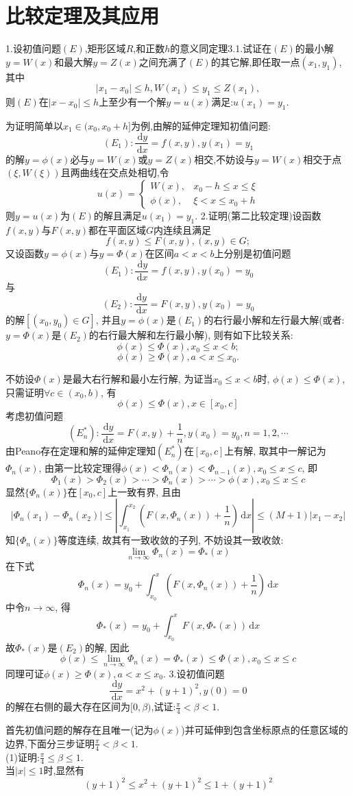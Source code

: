 \documentclass[titlepage,11pt,a4paper,twoside]{report}
\makeatletter
\newcommand\diff{\,\mathrm{d}}
\renewenvironment{proof}{\par
	\pushQED{\qed}%
	\normalfont \topsep1\p@\@plus6\p@\relax
	\trivlist
	\item\relax
	{\hspace*{\parindent}{\heiti 证明}\@addpunct{:}}\hspace\labelsep\ignorespaces
}{%
	\popQED\endtrivlist\@endpefalse
}
\makeatother
\begin{document}
\section{比较定理及其应用}
1.设初值问题$(E)$,矩形区域$R$,和正数$h$的意义同定理3.1.试证在$(E)$的最小解$y=W(x)$和最大解$y=Z(x)$之间充满了$(E)$的其它解,即任取一点$(x_1,y_1)$,其中
\[|x_1-x_0|\leq h,W(x_1)\leq y_1\leq Z(x_1),\]
则$(E)$在$|x-x_0|\leq h$上至少有一个解$y=u(x)$满足:$u(x_1)=y_1$.
\begin{proof}
为证明简单以$x_1\in(x_0,x_0+h]$为例,由解的延伸定理知初值问题:\[(E_1):\frac{\diff y}{\diff x}=f(x,y),y(x_1)=y_1\]的解$y=\phi(x)$必与$y=W(x)$或$y=Z(x)$相交,不妨设与$y=W(x)$相交于点$(\xi,W(\xi))$且两曲线在交点处相切,令
\[u(x)=\begin{cases}
W(x),&x_0-h\leq x\leq\xi\\
\phi(x),&\xi<x\leq x_0+h
\end{cases}\]
则$y=u(x)$为$(E)$的解且满足$u(x_1)=y_1$.
\end{proof}
2.证明(第二比较定理)设函数$f(x,y)$与$F(x,y)$都在平面区域$G$内连续且满足
\[f(x,y)\leq F(x,y),(x,y)\in G;\]
又设函数$y=\phi(x)$与$y=\varPhi(x)$在区间$a<x<b$上分别是初值问题\[(E_1):\frac{\diff y}{\diff x}=f(x,y),y(x_0)=y_0\]
与\[(E_2):\frac{\diff y}{\diff x}=F(x,y),y(x_0)=y_0\]
的解$[(x_0,y_0)\in G]$, 并且$y=\phi(x)$是$(E_1)$的右行最小解和左行最大解(或者: $y=\varPhi(x)$是$(E_2)$的右行最大解和左行最小解), 则有如下比较关系:
\[\phi(x)\leq\varPhi(x),x_0\leq x<b;\]
\[\phi(x)\geq\varPhi(x),a<x\leq x_0.\]
\begin{proof}不妨设$\varPhi(x)$是最大右行解和最小左行解, 为证当$x_0\leq x<b$时, $\phi(x)\leq\varPhi(x)$, 只需证明$\forall c\in(x_0,b)$, 有
\[\phi(x)\leq\varPhi(x),x\in[x_0,c]\]
考虑初值问题
\[(E_n^*):\frac{\diff y}{\diff x}=F(x,y)+\frac{1}{n},y(x_0)=y_0,n=1,2,\cdots\]
由Peano存在定理和解的延伸定理知$(E_n^*)$在$[x_0,c]$上有解, 取其中一解记为$\varPhi_n(x)$, 由第一比较定理得$\phi(x)<\varPhi_n(x)<\varPhi_{n-1}(x),x_0\leq x\leq c$, 即
\[\varPhi_1(x)>\varPhi_2(x)>\cdots>\varPhi_n(x)>\cdots>\phi(x),x_0\leq x\leq c\]
显然$\{\varPhi_n(x)\}$在$[x_0,c]$上一致有界, 且由
\[|\varPhi_n(x_1)-\varPhi_n(x_2)|\leq\left|\int_{x_1}^{x_2}\left(F(x,\varPhi_n(x))+\frac{1}{n}\right)\diff x\right|\leq(M+1)|x_1-x_2|\]
知$\{\varPhi_n(x)\}$等度连续, 故其有一致收敛的子列, 不妨设其一致收敛:
\[\lim_{n\to\infty}\varPhi_n(x)=\varPhi_*(x)\]
在下式
\[\varPhi_n(x)=y_0+\int_{x_0}^x\left(F(x,\varPhi_n(x))+\frac{1}{n}\right)\diff x\]
中令$n\to\infty$, 得
\[\varPhi_*(x)=y_0+\int_{x_0}^xF(x,\varPhi_*(x))\diff x\]
故$\varPhi_*(x)$是$(E_2)$的解, 因此
\[\phi(x)\leq\lim_{n\to\infty}\varPhi_n(x)=\varPhi_*(x)\leq\varPhi(x),x_0\leq x\leq c\]
同理可证$\phi(x)\geq\varPhi(x),a<x\leq x_0$.
\end{proof}
3.设初值问题
\[\frac{\diff y}{\diff x}=x^2+(y+1)^2,y(0)=0\]
的解在右侧的最大存在区间为$[0,\beta)$,试证:$\frac{\pi}{4}<\beta<1$.
\begin{proof}
首先初值问题的解存在且唯一(记为$\phi(x)$)并可延伸到包含坐标原点的任意区域的边界,下面分三步证明$\frac{\pi}{4}<\beta<1$.\\
(1)证明:$\frac{\pi}{4}\leq\beta\leq1$.\\
当$|x|\leq1$时,显然有
\[(y+1)^2\leq x^2+(y+1)^2\leq1+(y+1)^2\]
\end{proof}
\end{document}
